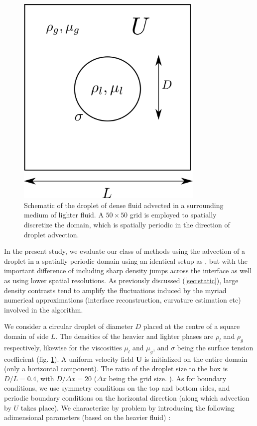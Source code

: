 \begin{figure}[h!]
    \centering
    \includegraphics[width = 0.8\textwidth]{plots/droplet_advect/config.png}
    \caption{Schematic of the droplet of dense fluid advected in a surrounding medium of lighter fluid. A $50 \times 50$ grid is employed to spatially discretize the domain, which is spatially periodic in the direction of droplet advection.}
    \label{moving_conf}
\end{figure}

In the present study, we evaluate our class of methods using the advection of a droplet in a spatially periodic domain using an identical setup as \cite{popinet2009accurate}, but with the important difference of including sharp density jumps across the interface as well as using lower spatial resolutions. As previously discussed (\ref{sec:static}), large density contrasts tend to amplify the fluctuations induced by the myriad numerical approximations (interface reconstruction, curvature estimation etc) involved in the algorithm.

We consider a circular droplet of diameter $D$ placed at the centre of a square domain of side $L$. The densities of the heavier and lighter phases are $\rho_l$ and $\rho_g$ respectively, likewise for the viscosities $\mu_l$ and $\mu_g$, and $\sigma$ being the surface tension coefficient (fig. \ref{moving_conf}). A uniform velocity field $\boldsymbol{U}$ is initialized on the entire domain (only a horizontal component). The ratio of the droplet size to the box is $D/L = 0.4$, with $D/\Delta x= 20$ ($\Delta x$ being the grid size.  ). As for boundary conditions, we use symmetry conditions on the top and bottom sides, and periodic boundary conditions on the horizontal direction (along which advection by $U$ takes place). We characterize by problem by introducing the following adimensional parameters (based on the heavier fluid) :

